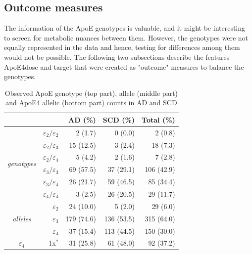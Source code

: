 \documentclass{amsart}
\begin{document}
\subsection{Outcome measures}\label{featureeng}
The information of the ApoE genotypes is valuable, and it might be interesting to screen for metabolic nuances between them. However, the genotypes were not equally represented in the data and hence, testing for differences among them would not be possible. The following two subsections describe the features ApoE4dose and target that were created as "outcome" measures to balance the genotypes.

\begin{table}
  \caption{Observed ApoE genotype (top part), allele (middle part) and ApoE4 allelic (bottom part) counts in AD and SCD}
\begin{threeparttable}
\centering 
\label{tab:ApoEfreq}
  \begin{tabular}{crrrr} \toprule
    \multicolumn{1}{l}{}                & \multicolumn{1}{l}{}               & AD (\%)    & SCD (\%)   & Total (\%)  \\ \midrule
    \multirow{6}{*}{\textit{genotypes}} & $\varepsilon_2/\varepsilon_2$        & 2 (1.7)    & 0 (0.0)    & 2 (0.8)     \\
                                        & $\varepsilon_2/\varepsilon_3$      & 15 (12.5)  & 3 (2.4)    & 18 (7.3)    \\
                                        & $\varepsilon_2/\varepsilon_4$      & 5 (4.2)    & 2 (1.6)    & 7 (2.8)     \\
                                        & $\varepsilon_3/\varepsilon_3$      & 69 (57.5)  & 37 (29.1)  & 106 (42.9)  \\
                                        & $\varepsilon_3/\varepsilon_4$      & 26 (21.7)  & 59 (46.5)  & 85 (34.4)   \\
                                        & $\varepsilon_4/\varepsilon_4$      & 3 (2.5)    & 26 (20.5)  & 29 (11.7)   \\ \midrule
   \multirow{3}{*}{\textit{alleles}}    & $\varepsilon_2$    & 24 (10.0)  & 5 (2.0)    & 29 (6.0)    \\
                                        & $\varepsilon_3$    & 179 (74.6) & 136 (53.5) & 315 (64.0)    \\
                                        & $\varepsilon_4$   & 37 (15.4)  & 113 (44.5) & 150 (30.0)    \\ \midrule
    \multirow{4}{*}{$\varepsilon_4$}   & 1x$^\ast$            & 31 (25.8)  & 61 (48.0)  & 92 (37.2)   \\

\end{tabular}
\end{threeparttable}
\end{table}
\end{document}
